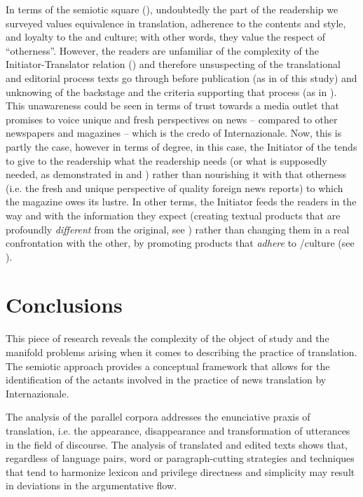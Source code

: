 \documentclass[output=paper]{LSP/langsci}
\begin{document}
In terms of the semiotic square (), undoubtedly the part of the readership we surveyed values equivalence in translation, adherence to the contents and style, and loyalty to the  and culture; with other words, they value the respect of ``otherness''. However, the readers are unfamiliar of the complexity of the Initiator-Translator relation () and therefore unsuspecting of the translational and editorial process texts go through before publication (as in  of this study) and unknowing of the backstage and the criteria supporting that process (as in ). This unawareness could be seen in terms of trust towards a media outlet that promises to voice unique and fresh perspectives on news -- compared to other  newspapers and magazines -- which is the credo of Internazionale. Now, this is partly the case, however in terms of degree, in this case, the Initiator of the  tends to give to the readership what the readership needs (or what is supposedly needed, as demonstrated in  and ) rather than nourishing it with that otherness (i.e. the fresh and unique perspective of quality foreign news reports) to which the magazine owes its lustre. In other terms, the Initiator feeds the readers in the way and with the information they expect (creating textual products that are profoundly \textit{different} from the original, see ) rather than changing them in a real confrontation with the other, by promoting products that \textit{adhere} to /culture (see ). 

\section{Conclusions} 

This piece of research reveals the complexity of the object of study and the manifold problems arising when it comes to describing the practice of translation. The semiotic approach provides a conceptual framework that allows for the identification of the actants involved in the practice of news translation by Internazionale. 

The analysis of the parallel corpora addresses the enunciative praxis of translation, i.e. the appearance, disappearance and transformation of utterances in the field of discourse. The analysis of translated and edited texts shows that, regardless of language pairs, word or paragraph-cutting strategies and  techniques that tend to harmonize lexicon and privilege directness and simplicity may result in deviations in the argumentative flow. 
\end{document}
